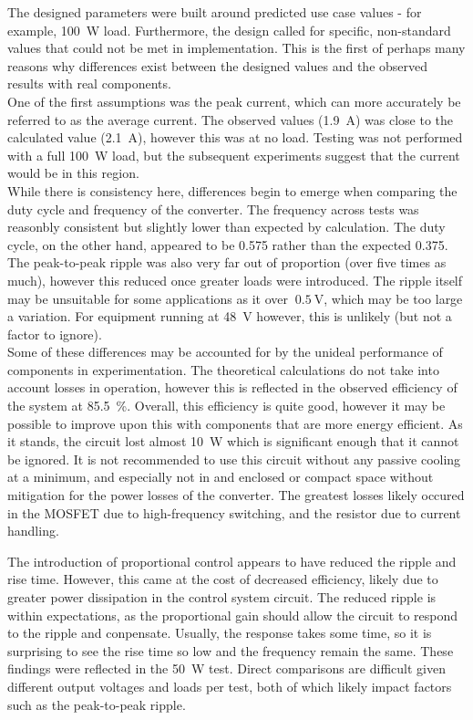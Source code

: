 The designed parameters were built around predicted use case values - for example, \qty{100}{\watt} load.
Furthermore, the design called for specific, non-standard values that could not be met in implementation.
This is the first of perhaps many reasons why differences exist between the designed values and the
observed results with real components. \\
One of the first assumptions was the peak current, which can more accurately be referred to as the average
current. The observed values (\qty{1.9}{\A}) was close to the calculated value (\qty{2.1}{\A}), however
this was at no load. Testing was not performed with a full \qty{100}{\watt} load, but the subsequent
experiments suggest that the current would be in this region.\\
While there is consistency here, differences begin to emerge when comparing the duty cycle and frequency
of the converter. The frequency across tests was reasonbly consistent but slightly lower than expected
by calculation. The duty cycle, on the other hand, appeared to be 0.575 rather than the expected 0.375.
The peak-to-peak ripple was also very far out of proportion (over five times as much), however this
reduced once greater loads were introduced. The ripple itself may be unsuitable for some applications as 
it over $~\qty{0.5}{\volt}$, which may be too large a variation. For equipment running at \qty{48}{\volt}
however, this is unlikely (but not a factor to ignore).\\
Some of these differences may be accounted for by the unideal performance of components in experimentation.
The theoretical calculations do not take into account losses in operation, however this is reflected in
the observed efficiency of the system at \qty{85.5}{\percent}. Overall, this efficiency is quite good,
however it may be possible to improve upon this with components that are more energy efficient. As it
stands, the circuit lost almost \qty{10}{\watt} which is significant enough that it cannot be ignored.
It is not recommended to use this circuit without any passive cooling at a minimum, and especially not in
and enclosed or compact space without mitigation for the power losses of the converter. The greatest losses
likely occured in the MOSFET due to high-frequency switching, and the resistor due to current handling.

The introduction of proportional control appears to have reduced the ripple and rise time.
 However, this came at the cost of decreased efficiency, likely 
due to greater power dissipation in the control system circuit. The reduced ripple is within expectations,
as the proportional gain should allow the circuit to respond to the ripple and conpensate. Usually,
the response takes some time, so it is surprising to see the rise time so low and the frequency remain 
the same. These findings were reflected in the \qty{50}{\watt} test. Direct comparisons are difficult 
given different output voltages and loads per test, both of which likely impact factors such as 
the peak-to-peak ripple.

